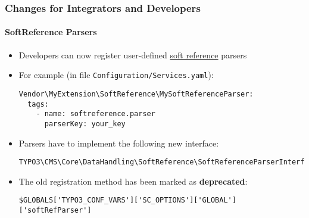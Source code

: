 %

\begin{frame}[fragile]
	\frametitle{Changes for Integrators and Developers}
	\framesubtitle{SoftReference Parsers}


	\begin{itemize}
		\item Developers can now register user-defined
			\href{https://docs.typo3.org/m/typo3/reference-coreapi/master/en-us/ApiOverview/SoftReferences/Index.html#soft-references}{soft reference}
			parsers

		\item For example (in file \texttt{Configuration/Services.yaml}):
\begin{lstlisting}
Vendor\MyExtension\SoftReference\MySoftReferenceParser:
  tags:
    - name: softreference.parser
      parserKey: your_key
\end{lstlisting}

		\item Parsers have to implement the following new interface:
\begin{lstlisting}
TYPO3\CMS\Core\DataHandling\SoftReference\SoftReferenceParserInterface
\end{lstlisting}

		\item The old registration method has been marked as \textbf{deprecated}:
\begin{lstlisting}
$GLOBALS['TYPO3_CONF_VARS']['SC_OPTIONS']['GLOBAL']['softRefParser']
\end{lstlisting}

	\end{itemize}

\end{frame}

